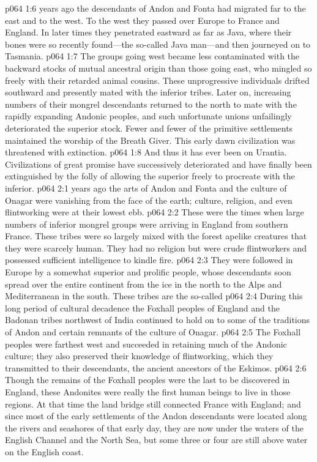 \pc \vs p064 1:6  years ago the descendants of Andon and Fonta had migrated far to the east and to the west. To the west they passed over Europe to France and England. In later times they penetrated eastward as far as Java, where their bones were so recently found---the so\hyp{}called Java man---and then journeyed on to Tasmania.
\vs p064 1:7 The groups going west became less contaminated with the backward stocks of mutual ancestral origin than those going east, who mingled so freely with their retarded animal cousins. These unprogressive individuals drifted southward and presently mated with the inferior tribes. Later on, increasing numbers of their mongrel descendants returned to the north to mate with the rapidly expanding Andonic peoples, and such unfortunate unions unfailingly deteriorated the superior stock. Fewer and fewer of the primitive settlements maintained the worship of the Breath Giver. This early dawn civilization was threatened with extinction.\plusone
\vs p064 1:8 And thus it has ever been on Urantia. Civilizations of great promise have successively deteriorated and have finally been extinguished by the folly of allowing the superior freely to procreate with the inferior.
\vs p064 2:1  years ago the arts of Andon and Fonta and the culture of Onagar were vanishing from the face of the earth; culture, religion, and even flintworking were at their lowest ebb.
\vs p064 2:2 These were the times when large numbers of inferior mongrel groups were arriving in England from southern France. These tribes were so largely mixed with the forest apelike creatures that they were scarcely human. They had no religion but were crude flintworkers and possessed sufficient intelligence to kindle fire.
\vs p064 2:3 They were followed in Europe by a somewhat superior and prolific people, whose descendants soon spread over the entire continent from the ice in the north to the Alps and Mediterranean in the south. These tribes are the so\hyp{}called \plusone
\vs p064 2:4 During this long period of cultural decadence the Foxhall peoples of England and the Badonan tribes northwest of India continued to hold on to some of the traditions of Andon and certain remnants of the culture of Onagar.
\pc \vs p064 2:5 The Foxhall peoples were farthest west and succeeded in retaining much of the Andonic culture; they also preserved their knowledge of flintworking, which they transmitted to their descendants, the ancient ancestors of the Eskimos.
\vs p064 2:6 Though the remains of the Foxhall peoples were the last to be discovered in England, these Andonites were really the first human beings to live in those regions. At that time the land bridge still connected France with England; and since most of the early settlements of the Andon descendants were located along the rivers and seashores of that early day, they are now under the waters of the English Channel and the North Sea, but some three or four are still above water on the English coast.
